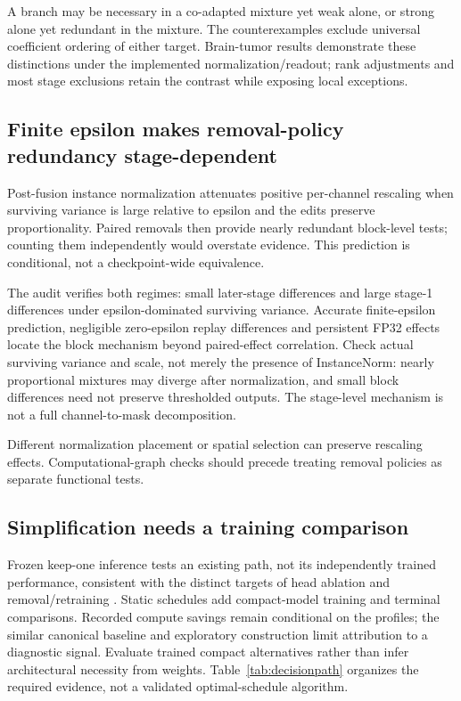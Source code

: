 \documentclass[mathematics,article,submit,pdftex,moreauthors]{Definitions/mdpi}
\begin{document}
A branch may be necessary in a co-adapted mixture yet weak alone, or strong
alone yet redundant in the mixture. The counterexamples exclude universal
coefficient ordering of either target. Brain-tumor results demonstrate these
distinctions under the implemented normalization/readout; rank adjustments
and most stage exclusions retain the contrast while exposing local exceptions.

\subsection{Finite epsilon makes removal-policy redundancy stage-dependent}
Post-fusion instance normalization attenuates positive per-channel rescaling
when surviving variance is large relative to epsilon and the edits preserve
proportionality. Paired removals then provide nearly redundant block-level
tests; counting them independently would overstate evidence. This prediction
is conditional, not a checkpoint-wide equivalence.

The audit verifies both regimes: small later-stage differences and large
stage-1 differences under epsilon-dominated surviving variance. Accurate
finite-epsilon prediction, negligible zero-epsilon replay differences and
persistent FP32 effects locate the block mechanism beyond paired-effect
correlation. Check actual surviving variance and scale, not merely the
presence of InstanceNorm: nearly proportional mixtures may diverge after
normalization, and small block differences need not preserve thresholded
outputs. The stage-level mechanism is not a full channel-to-mask decomposition.

Different normalization placement or spatial selection can preserve rescaling
effects. Computational-graph checks should precede treating removal policies
as separate functional tests.

\subsection{Simplification needs a training comparison}
Frozen keep-one inference tests an existing path, not its independently
trained performance, consistent with the distinct targets of head ablation
and removal/retraining \cite{michel2019heads,hooker2019roar}. Static schedules
add compact-model training and terminal comparisons. Recorded compute savings
remain conditional on the profiles; the similar canonical baseline and
exploratory construction limit attribution to a diagnostic signal. Evaluate
trained compact alternatives rather than infer architectural necessity from
weights. Table~\ref{tab:decisionpath} organizes the required evidence, not
a validated optimal-schedule algorithm.
\end{document}
